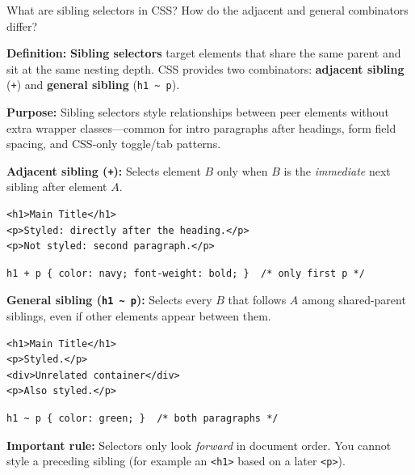 \question[4]
What are sibling selectors in CSS? How do the adjacent and general combinators differ?
\begin{solutionorbox}[3.75in]
\textbf{Definition:} \textbf{Sibling selectors} target elements that share the same parent and sit at the same nesting depth. CSS provides two combinators: \textbf{adjacent sibling} (\lstinline[style=cssinline]|+|) and \textbf{general sibling} (\lstinline[style=cssinline]!h1 ~ p!).

\textbf{Purpose:} Sibling selectors style relationships between peer elements without extra wrapper classes---common for intro paragraphs after headings, form field spacing, and CSS-only toggle/tab patterns.

\textbf{Adjacent sibling (\lstinline[style=cssinline]|+|):} Selects element $B$ only when $B$ is the \emph{immediate} next sibling after element $A$.

\begin{lstlisting}[style=html]
<h1>Main Title</h1>
<p>Styled: directly after the heading.</p>
<p>Not styled: second paragraph.</p>
\end{lstlisting}
\begin{lstlisting}[style=css]
h1 + p { color: navy; font-weight: bold; }  /* only first p */
\end{lstlisting}

\textbf{General sibling (\lstinline[style=cssinline]!h1 ~ p!):} Selects every $B$ that follows $A$ among shared-parent siblings, even if other elements appear between them.

\begin{lstlisting}[style=html]
<h1>Main Title</h1>
<p>Styled.</p>
<div>Unrelated container</div>
<p>Also styled.</p>
\end{lstlisting}
\begin{lstlisting}[style=css]
h1 ~ p { color: green; }  /* both paragraphs */
\end{lstlisting}

\textbf{Important rule:} Selectors only look \emph{forward} in document order. You cannot style a preceding sibling (for example an \lstinline[style=htmlinline]|<h1>| based on a later \lstinline[style=htmlinline]|<p>|).
\end{solutionorbox}

